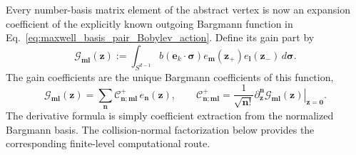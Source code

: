 \documentclass[11pt,oneside]{article}
\numberwithin{equation}{section}
\theoremstyle{definition}
\begin{document}
Every number-basis matrix element of the abstract vertex is now an expansion coefficient of the explicitly known outgoing Bargmann function in Eq.~\eqref{eq:maxwell_basis_pair_Bobylev_action}.  Define its gain part by
\begin{equation}
\mathcal G_{\bm m\bm l}(\bm z)
:=
\int_{S^{d-1}}
 b(\bm e_k\!\cdot\!\bm\sigma)
 e_{\bm m}(\bm z_+)e_{\bm l}(\bm z_-)
 \,d\bm\sigma .
\label{eq:maxwell_gain_polynomial_def}
\end{equation}
The gain coefficients are the unique Bargmann coefficients of this function,
\begin{equation}
\mathcal G_{\bm m\bm l}(\bm z)
=
\sum_{\bm n}
\mathcal C^{+}_{\bm n;\bm m\bm l}\,
 e_{\bm n}(\bm z),
\qquad
\mathcal C^{+}_{\bm n;\bm m\bm l}
=
\frac{1}{\sqrt{\bm n!}}
\left.
\partial_{\bm z}^{\bm n}\mathcal G_{\bm m\bm l}(\bm z)
\right|_{\bm z=\bm0}.
\label{eq:maxwell_gain_coefficients_explicit}
\end{equation}
The derivative formula is simply coefficient extraction from the normalized Bargmann basis.  The collision-normal factorization below provides the corresponding finite-level computational route.
\end{document}
